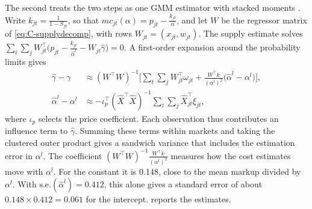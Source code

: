 The second treats the two steps as one GMM estimator with stacked moments \citep{Newey1984, MurphyTopel1985}. Write
$k_{jt} = \frac{1}{1 - S_{ft}}$, so that $mc_{jt}(\alpha) = p_{jt} - \frac{k_{jt}}{\alpha}$, and let $W$ be the regressor
matrix of \eqref{eq:C-supplydecomp}, with rows $W_{jt} = (x_{jt}, w_{jt})$. The supply estimate solves
$\sum_{t}\sum_j W_{jt}^\top\big(p_{jt} - \frac{k_{jt}}{\hat\alpha^l} - W_{jt}\hat\gamma\big) = 0$. A first-order expansion
around the probability limits gives
\begin{equation}\label{eq:C-stacked}
  \begin{aligned}
  \hat\gamma - \gamma &\approx (W^\top W)^{-1}\Big[\sum_{t}\sum_j W_{jt}^\top\omega_{jt}
  + \frac{W^\top k}{(\alpha^l)^2}\big(\hat\alpha^l - \alpha^l\big)\Big], \\
  \hat\alpha^l - \alpha^l &\approx -\iota_p^\top(\hat X^\top\hat X)^{-1}\sum_{t}\sum_j\hat X_{jt}^\top\xi_{jt},
  \end{aligned}
\end{equation}
where $\iota_p$ selects the price coefficient. Each observation thus contributes an influence term to $\hat\gamma$.
Summing these terms within markets and taking the clustered outer product gives a sandwich variance that includes the
estimation error in $\alpha^l$. The coefficient $(W^\top W)^{-1}\frac{W^\top k}{(\alpha^l)^2}$ measures how the cost estimates
move with $\alpha^l$. For the constant it is 0.148, close to the mean markup divided by $\alpha^l$. With
$\text{s.e.}(\hat\alpha^l) = 0.412$, this alone gives a standard error of about $0.148 \times 0.412 = 0.061$ for the
intercept.  reports the estimates.

